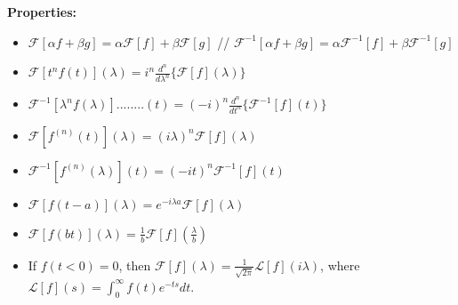 {\bf Properties:} 
\begin{itemize}
\item $\mathcal{F}[\alpha f+\beta g]=\alpha \mathcal{F}[f]+\beta \mathcal{F}[g]$ // $\mathcal{F}^{-1}[\alpha f+\beta g]=\alpha \mathcal{F}^{-1}[f]+\beta \mathcal{F}^{-1}[g]$
\item $\mathcal{F}[t^nf(t)](\lambda)=i^n\frac{d^n}{d\lambda^n}\{\mathcal{F}[f](\lambda)\}$
\item $\mathcal{F}^{-1}[\lambda^nf(\lambda)]........(t)=(-i)^n\frac{d^n}{dt^n}\{\mathcal{F}^{-1}[f](t)\}$
\item $\mathcal{F}[f^{(n)}(t)](\lambda)=(i\lambda)^n\mathcal{F}[f](\lambda)$
\item $\mathcal{F}^{-1}[f^{(n)}(\lambda)](t)=(-it)^n\mathcal{F}^{-1}[f](t)$
\item $\mathcal{F}[f(t-a)](\lambda)=e^{-i\lambda a}\mathcal{F}[f](\lambda)$
\item $\mathcal{F}[f(bt)](\lambda)=\frac{1}{b}\mathcal{F}[f](\frac{\lambda}{b})$
\item If $f(t<0)=0$, then $\mathcal{F}[f](\lambda)=\frac{1}{\sqrt{2\pi}}\mathcal{L}[f](i\lambda)$, where \newline $\mathcal{L}[f](s)=\int_0^{\infty}f(t)e^{-ts}dt$.
\end{itemize}